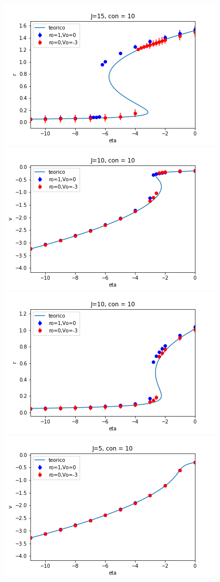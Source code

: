 \documentclass[a4paper]{article}
\begin{document}
\includegraphics[scale=0.7]{r_vs_eta_J15_con10.png}\\
\includegraphics[scale=0.7]{v_vs_eta_J10_con10.png}\\
\includegraphics[scale=0.7]{r_vs_eta_J10_con10.png}\\
\includegraphics[scale=0.7]{v_vs_eta_J5_con10.png}\\
\end{document}
